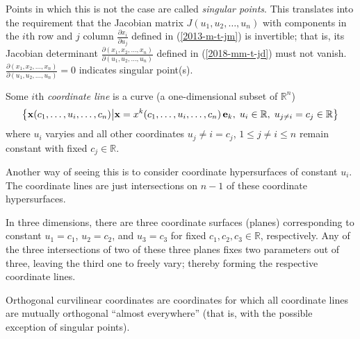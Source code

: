 Points
in which this is not the case are called
{\em singular points}.
This translates into the requirement that the
Jacobian matrix
$
J (u_1, u_2,\ldots ,u_n)
$
with components in the $i$th row and $j$ column
$
\frac{\partial x_i}{\partial u_j}
$
defined in (\ref{2013-m-t-jm})
is invertible; that is,
its Jacobian determinant
$
\frac{
\partial
(
x_1, x_2,\ldots ,x_n
)
}{
\partial
(
u_1, u_2,\ldots ,u_n
)
}
$
defined in
(\ref{2018-mm-t-jd})
must not vanish.
$
\frac{
\partial
(
x_1, x_2,\ldots ,x_n
)
}{
\partial
(
u_1, u_2,\ldots ,u_n
)
}
=0
$
indicates singular point(s).

Some $i$th {\em coordinate line}
is a curve  (a one-dimensional subset of $\mathbb{R}^n$)
\begin{equation}
\left\{ {\bf x}(c_1, \ldots ,u_i,\ldots , c_n)
\middle|
{\bf x} = x^k(c_1, \ldots ,u_i,\ldots , c_n) \, {\bf e}_k ,\;
u_i\in \mathbb{R}, \;
u_{j\neq i} = c_j \in \mathbb{R}
\right\}
\label{2018-mm-ch-ten-cl}
\end{equation}
where $u_i$ varyies and all other coordinates $u_j{\neq i} = c_j$, $1\le j\neq i\le n$
remain constant with fixed  $c_j \in \mathbb{R}$.

Another way of seeing this is to consider coordinate hypersurfaces of constant $u_i$.
The coordinate lines are just intersections on $n-1$ of these coordinate hypersurfaces.


In three dimensions, there are  three coordinate surfaces (planes) corresponding to constant
$u_1=c_1$,
$u_2=c_2$, and
$u_3=c_3$ for fixed $c_1,c_2,c_3 \in \mathbb{R}$, respectively.
Any of the three intersections of two of these three planes
fixes two parameters out of three, leaving the third one to freely vary;
thereby forming the respective coordinate lines.






Orthogonal curvilinear coordinates are coordinates for which all coordinate
lines are mutually orthogonal ``almost everywhere''
(that is, with the possible exception of singular points).


